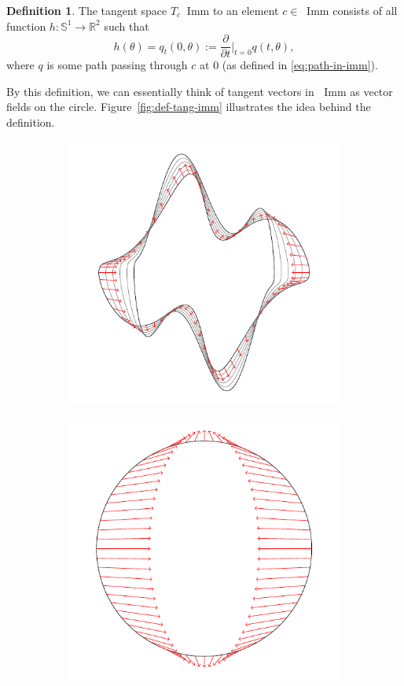 \documentclass[a4,danish]{article}
\theoremstyle{break}
\theoremstyle{definition}
\newtheorem{definition}[subsection]{Definition}
\theoremstyle{Break}
\newcommand{\R}{\mathbb{R}}
\newcommand*\I{\mathop{}\!\mathrm{Imm}}
\renewcommand{\S}{\mathbb{S}}
\begin{document}
\begin{definition}
  The tangent space $T_{c}\I$ to an element $c \in \I$ consists of all function
  $h\colon \S^1 \rightarrow \R^2$ such that
  \begin{equation*}
    h(\theta) = q_t(0, \theta) := \frac{\partial }{\partial t} \bigg\vert_{t=0} q(t,\theta),
  \end{equation*}
  where $q$ is some path passing through $c$ at 0 (as defined in \eqref{eq:path-in-imm}).
\end{definition}

By this definition, we can essentially think of tangent vectors in $\I$ as vector fields on the circle. Figure~\ref{fig:def-tang-imm} illustrates the idea behind the definition. 

\begin{figure}
  \centering
  \begin{subfigure}{.49\textwidth}
    \centering
    \includegraphics[width=1\linewidth]{path.pdf}
  \end{subfigure}
  \begin{subfigure}{.49\textwidth}
    \centering
    \includegraphics[width=0.8\linewidth]{circle_vectorfield.pdf}

\end{subfigure}
\end{figure}
\end{document}
